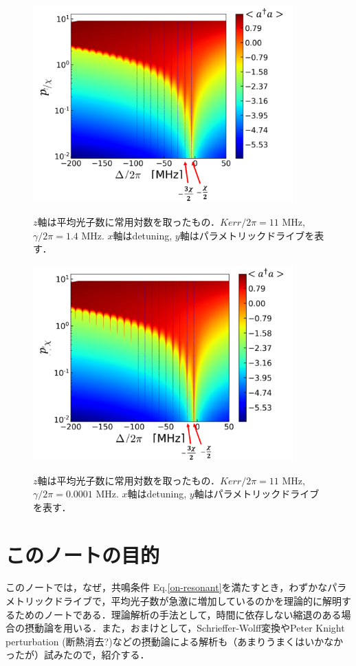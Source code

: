 \begin{figure}[h]
\centering
		\includegraphics[width=10cm]{file/fig/numerical_steady/spect_number_td2D_Keer_11_decay_1.4.png} \\
\caption{$z$軸は平均光子数に常用対数を取ったもの．$Kerr / 2\pi = 11$ MHz, $\gamma / 2\pi = 1.4$ MHz. $x$軸はdetuning, $y$軸はパラメトリックドライブを表す．}
\label{fig:kpo_steady_0.14}
\end{figure}


\begin{figure}[h]
\centering
		\includegraphics[width=10cm]{file/fig/numerical_steady/spect_number_td2D_Keer_11_decay_0.0001.png} \\
\caption{$z$軸は平均光子数に常用対数を取ったもの．$Kerr / 2\pi = 11$ MHz, $\gamma / 2\pi = 0.0001$ MHz. $x$軸はdetuning, $y$軸はパラメトリックドライブを表す．}
\label{fig:kpo_steady_0.0001}
\end{figure}


\section{このノートの目的}
このノートでは，なぜ，共鳴条件 Eq.\eqref{on-resonant}を満たすとき，わずかなパラメトリックドライブで，平均光子数が急激に増加しているのかを理論的に解明するためのノートである．理論解析の手法として，時間に依存しない縮退のある場合の摂動論を用いる．また，おまけとして，Schrieffer-Wolff変換やPeter Knight perturbation (断熱消去?)などの摂動論による解析も（あまりうまくはいかなかったが）試みたので，紹介する．


